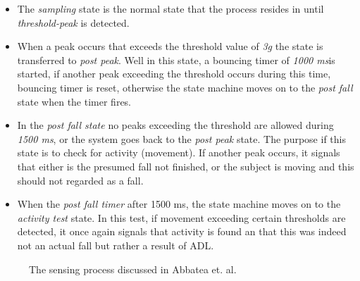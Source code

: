 \documentclass[12pt, a4paper, onecolumn]{article}
\begin{document}
	\begin{itemize}
		\item The \textit{sampling} state is the normal state that the process resides in until \textit{threshold-peak} is detected.
		
		\item When a peak occurs that exceeds the threshold value of \textit{3g} the state is transferred to \textit{post peak}. Well in this state, a bouncing timer of \textit{1000 ms}is started, if another peak exceeding the threshold occurs during this time, bouncing timer is reset, otherwise the state machine moves on to the \textit{post fall} state when the timer fires.
		
		\item In the \textit{post fall state} no peaks exceeding the threshold are allowed during \textit{1500 ms}, or the system goes back to the \textit{post peak} state. The purpose if this state is to check for activity (movement). If another peak occurs, it signals that either is the presumed fall not finished, or the subject is moving and this should not regarded as a fall. 
		
		\item When the \textit{post fall timer} after 1500 ms, the state machine moves on to the \textit{activity test} state. In this test, if movement exceeding certain thresholds are detected, it once again signals that activity is found an that this was indeed not an actual fall but rather a result of ADL. 
		
	\end{itemize}  
	
	\begin{figure}[h]
		\centering
		\caption{The sensing process discussed in Abbatea et. al.}%
		\label{fig:example}%
	\end{figure}
	
\end{document}
